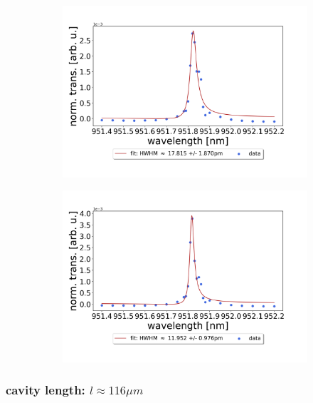 \begin{figure}[h!]
\begin{subfigure}[b]{0.49\textwidth}
        \includegraphics[width=\textwidth]{figures/results/single fano fits/220um_M5_fit_3.png}
        \caption{}
        \label{fig:220um_M5_fit_3}
    \end{subfigure}
    \begin{subfigure}[b]{0.49\textwidth}
        \includegraphics[width=\textwidth]{figures/results/single fano fits/220um_M5_fit_4.png}
        \caption{}
        \label{fig:220um_M5_fit_4}
    \end{subfigure}
\end{figure}

\clearpage
\subsubsection*{cavity length: $l \approx 116 \mu m$}

